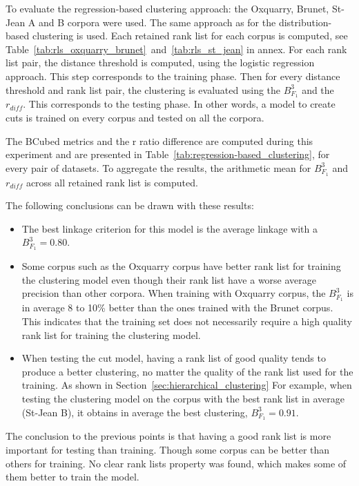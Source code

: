 To evaluate the regression-based clustering approach: the Oxquarry, Brunet, St-Jean A and B corpora were used.
The same approach as for the distribution-based clustering is used.
Each retained rank list for each corpus is computed, see Table~\ref{tab:rls_oxquarry_brunet}~and~\ref{tab:rls_st_jean} in annex.
For each rank list pair, the distance threshold is computed, using the logistic regression approach.
This step corresponds to the training phase.
Then for every distance threshold and rank list pair, the clustering is evaluated using the $B^3_{F_1}$ and the $r_{diff}$.
This corresponds to the testing phase.
In other words, a model to create cuts is trained on every corpus and tested on all the corpora.

The BCubed metrics and the r ratio difference are computed during this experiment and are presented in Table~\ref{tab:regression-based_clustering}, for every pair of datasets.
To aggregate the results, the arithmetic mean for $B^3_{F_1}$ and $r_{diff}$ across all retained rank list is computed.

The following conclusions can be drawn with these results:
\begin{itemize}
  \item
  The best linkage criterion for this model is the average linkage with a $B^3_{F_1} = 0.80$.
  \item
  Some corpus such as the Oxquarry corpus have better rank list for training the clustering model even though their rank list have a worse average precision than other corpora.
  When training with Oxquarry corpus, the $B^3_{F_1}$ is in average 8 to 10\% better than the ones trained with the Brunet corpus.
  This indicates that the training set does not necessarily require a high quality rank list for training the clustering model.
  \item
  When testing the cut model, having a rank list of good quality tends to produce a better clustering, no matter the quality of the rank list used for the training.
  As shown in Section~\ref{sec:hierarchical_clustering}
  For example, when testing the clustering model on the corpus with the best rank list in average (St-Jean B), it obtains in average the best clustering, $B^3_{F_1} = 0.91$.
\end{itemize}

The conclusion to the previous points is that having a good rank list is more important for testing than training.
Though some corpus can be better than others for training.
No clear rank lists property was found, which makes some of them better to train the model.

